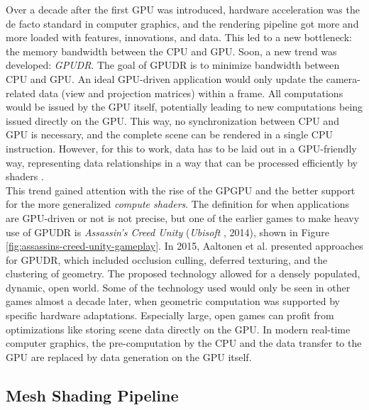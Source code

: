 \noindent
Over a decade after the first \ac{GPU} was introduced, hardware acceleration was the de facto standard in 
computer graphics, and the rendering pipeline got more and more loaded with features, innovations, and data. 
This led to a new bottleneck: the memory bandwidth between the \ac{CPU} and \ac{GPU}. Soon, a new trend was 
developed: \emph{\ac{GPUDR}}. The goal of \ac{GPUDR} is to minimize bandwidth between \ac{CPU} and \ac{GPU}. 
An ideal \ac{GPU}-driven application would only update the camera-related data (view and projection matrices) 
within a frame. All computations would be issued by the \ac{GPU} itself, potentially leading to new computations 
being issued directly on the \ac{GPU}. This way, no synchronization between \ac{CPU} and \ac{GPU} is necessary, 
and the complete scene can be rendered in a single \ac{CPU} instruction. However, for this to work, data has to 
be laid out in a \ac{GPU}-friendly way, representing data relationships in a way that can be processed 
efficiently by shaders \cite{VKGuide2020}. \\

\noindent
This trend gained attention with the rise of the \ac{GPGPU} and the better support for the more generalized 
\emph{compute shaders}. The definition for when applications are \ac{GPU}-driven or not is not precise, but 
one of the earlier games to make heavy use of \ac{GPUDR} is \emph{Assassin's Creed Unity} (\emph{Ubisoft} 
\cite{Ubisoft2014}, 2014), shown in Figure \ref{fig:assassins-creed-unity-gameplay}. In 2015, Aaltonen et al. 
\cite{Aaltonen2015} presented approaches for \ac{GPUDR}, which included occlusion culling, deferred texturing, 
and the clustering of geometry. The proposed technology allowed for a densely populated, dynamic, open world. 
Some of the technology used would only be seen in other games almost a decade later, when geometric computation 
was supported by specific hardware adaptations. Especially large, open games can profit from optimizations like 
storing scene data directly on the \ac{GPU}. In modern real-time computer graphics, the pre-computation by the 
\ac{CPU} and the data transfer to the \ac{GPU} are replaced by data generation on the \ac{GPU} itself.


\subsection*{Mesh Shading Pipeline} \label{subsec-mesh-shading-pipeline}

